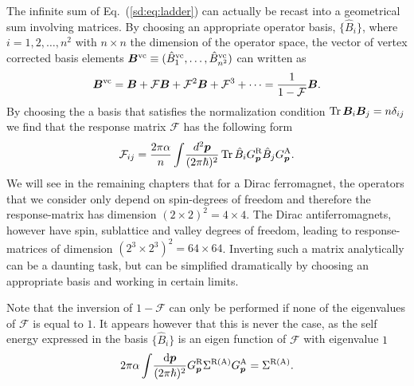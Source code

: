 The infinite sum of Eq.~(\ref{sd:eq:ladder}) can actually be recast into a geometrical sum involving matrices. By choosing an appropriate operator basis, $\{\hat{B}_i\}$, where $i=1,2,\dots,n^2$ with $n\times n$ the dimension of the operator space, the vector of vertex corrected basis elements $\boldsymbol{B}^\text{vc}\equiv(\hat{B}_1^\text{vc},\dots,\hat{B}_{{n^2}}^\text{vc})$ can written as
\begin{equation}
	\boldsymbol{B}^\text{vc} = \boldsymbol{B}+\mathcal{F}\boldsymbol{B}+\mathcal{F}^2\boldsymbol{B}+\mathcal{F}^3+\cdots = \frac{1}{1-\mathcal{F}}\boldsymbol{B}.
\end{equation}
By choosing the a basis that satisfies the normalization condition $\operatorname{Tr}\boldsymbol{B}_i\boldsymbol{B}_j=n\delta_{ij}$ we find that the response matrix $\mathcal{F}$ has the following form
\begin{equation}
	\mathcal{F}_{ij} = \frac{2\pi\alpha}{n} \int\!\frac{d^2\boldsymbol{p}}{(2\pi\hslash)^2}\operatorname{Tr} \hat{B}_i G^\text{R}_{\boldsymbol{p}} \hat{B}_j G^\text{A}_{\boldsymbol{p}}.
\end{equation}
We will see in the remaining chapters that for a Dirac ferromagnet, the operators that we consider only depend on spin-degrees of freedom and therefore the response-matrix has dimension $(2\times2)^2=4\times4$. The Dirac antiferromagnets, however have spin, sublattice and valley degrees of freedom, leading to response-matrices of dimension $(2^3\times2^3)^2=64\times64$. Inverting such a matrix analytically can be a daunting task, but can be simplified dramatically by choosing an appropriate basis and working in certain limits. 

Note that the inversion of $1-\mathcal{F}$ can only be performed if none of the eigenvalues of $\mathcal{F}$ is equal to $1$. It appears however that this is never the case, as the self energy expressed in the basis $\{\hat{B}_i\}$ is an eigen function of $\mathcal{F}$ with eigenvalue $1$
\begin{equation}
	2\pi\alpha\int\!\frac{\mathrm{d}\boldsymbol{p}}{(2\pi\hslash)^2} G^\text{R}_{\boldsymbol{p}}\Sigma^\text{R(A)}G^\text{A}_{\boldsymbol{p}} = \Sigma^\text{R(A)}.
\end{equation}

